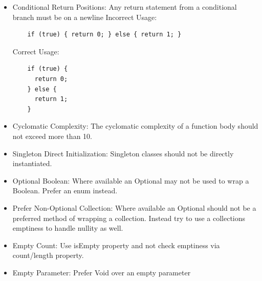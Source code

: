 \documentclass[12pt]{article}
\begin{document}
\begin{itemize}
     \newline
  \item Conditional Return Positions:\newline
    Any return statement from a conditional branch must be on a newline \newline
    Incorrect Usage: \newline
    \begin{verbatim}
    if (true) { return 0; } else { return 1; }
    \end{verbatim}
    Correct Usage: \newline
    \begin{verbatim}
    if (true) {
      return 0;
    } else {
      return 1;
    }
    \end{verbatim}
  \item Cyclomatic Complexity:\newline
    The cyclomatic complexity of a function body should not exceed more than 10. \newline
     \newline
  \item Singleton Direct Initialization:\newline
    Singleton classes should not be directly instantiated. \newline
     \newline
  \item Optional Boolean:\newline
    Where available an Optional may not be used to wrap a Boolean. Prefer an enum instead. \newline
     \newline
  \item Prefer Non-Optional Collection:\newline
    Where available an Optional should not be a preferred method of wrapping a collection. Instead try to \newline
    use a collections emptiness to handle nullity as well. \newline
     \newline
  \item Empty Count:\newline
    Use isEmpty property and not check emptiness via count/length property. \newline
     \newline
  \item Empty Parameter:\newline
    Prefer Void over an empty parameter \newline

\end{itemize}
\end{document}
